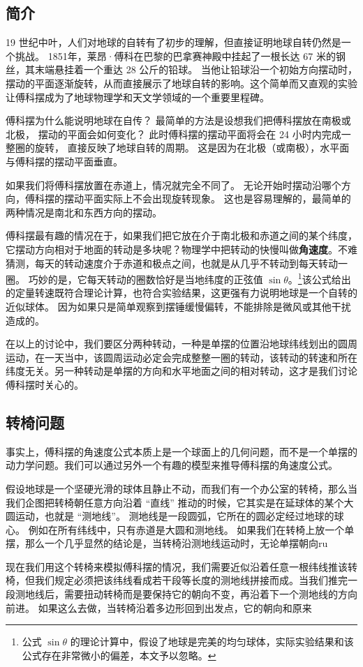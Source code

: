 
\begin{issues}
\issueDraft
\end{issues}

\subsection{简介}
19 世纪中叶，人们对地球的自转有了初步的理解，但直接证明地球自转仍然是一个挑战。 1851年，莱昂·傅科在巴黎的巴拿赛神殿中挂起了一根长达 67 米的钢丝，其末端悬挂着一个重达 28 公斤的铅球。 当他让铅球沿一个初始方向摆动时，摆动的平面逐渐旋转，从而直接展示了地球自转的影响。这个简单而又直观的实验让傅科摆成为了地球物理学和天文学领域的一个重要里程碑。

傅科摆为什么能说明地球在自传？ 最简单的方法是设想我们把傅科摆放在南极或北极， 摆动的平面会如何变化？ 此时傅科摆的摆动平面将会在 24 小时内完成一整圈的旋转， 直接反映了地球自转的周期。 这是因为在北极（或南极），水平面与傅科摆的摆动平面垂直。

如果我们将傅科摆放置在赤道上，情况就完全不同了。 无论开始时摆动沿哪个方向，傅科摆的摆动平面实际上不会出现旋转现象。 这也是容易理解的，最简单的两种情况是南北和东西方向的摆动。

傅科摆最有趣的情况在于，如果我们把它放在介于南北极和赤道之间的某个纬度，它摆动方向相对于地面的转动是多块呢？物理学中把转动的快慢叫做\textbf{角速度}。不难猜测，每天的转动速度介于赤道和极点之间，也就是从几乎不转动到每天转动一圈。 巧妙的是，它每天转动的圈数恰好是当地纬度的正弦值 $\sin\theta$。\footnote{公式 $\sin\theta$ 的理论计算中，假设了地球是完美的均匀球体，实际实验结果和该公式存在非常微小的偏差，本文予以忽略。}该公式给出的定量转速既符合理论计算，也符合实验结果，这更强有力说明地球是一个自转的近似球体。 因为如果只是简单观察到摆锤缓慢偏转，不能排除是微风或其他干扰造成的。

在以上的讨论中，我们要区分两种转动，一种是单摆的位置沿地球纬线划出的圆周运动，在一天当中，该圆周运动必定会完成整整一圈的转动，该转动的转速和所在纬度无关。另一种转动是单摆的方向和水平地面之间的相对转动，这才是我们讨论傅科摆时关心的。

\subsection{转椅问题}
事实上，傅科摆的角速度公式本质上是一个球面上的几何问题，而不是一个单摆的动力学问题。我们可以通过另外一个有趣的模型来推导傅科摆的角速度公式。

假设地球是一个坚硬光滑的球体且静止不动，而我们有一个办公室的转椅，那么当我们企图把转椅朝任意方向沿着 “直线” 推动的时候，它其实是在延球体的某个大圆运动，也就是 “测地线”。 测地线是一段圆弧，它所在的圆必定经过地球的球心。 例如在所有纬线中，只有赤道是大圆和测地线。 如果我们在转椅上放一个单摆，那么一个几乎显然的结论是，当转椅沿测地线运动时，无论单摆朝向ru

现在我们用这个转椅来模拟傅科摆的情况，我们需要近似沿着任意一根纬线推该转椅，但我们规定必须把该纬线看成若干段等长度的测地线拼接而成。当我们推完一段测地线后，需要扭动转椅而是要保持它的朝向不变，再沿着下一个测地线的方向前进。 如果这么去做，当转椅沿着多边形回到出发点，它的朝向和原来
